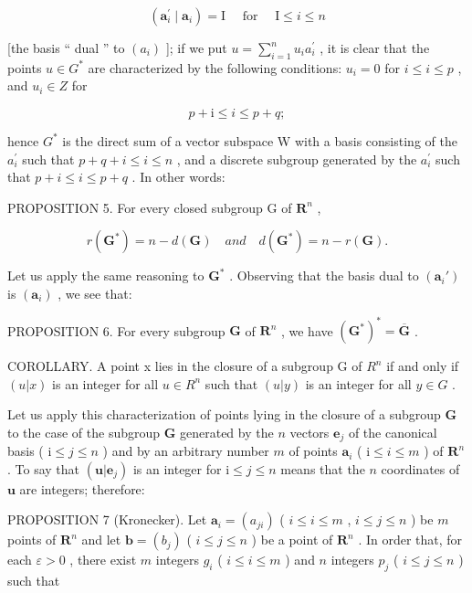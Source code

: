 \[
\left(\boldsymbol {a} _ {i} ^ {\prime} \mid \boldsymbol {a} _ {i}\right) = \mathrm{I} \quad \text { for } \quad \mathrm{I} \leqslant i \leqslant n
\]

{[}the basis `` dual '' to \((a_{i})\) {]}; if we put \(u = \sum_{i=1}^{n} u_{i} a_{i}^{\prime}\) , it is clear that the points \(u \in G^{*}\) are characterized by the following conditions: \(u_{i} = 0\) for \(i \leqslant i \leqslant p\) , and \(u_{i} \in Z\) for

\[
p + \mathrm{i} \leqslant i \leqslant p + q;
\]

hence \(G^{*}\) is the direct sum of a vector subspace W with a basis consisting of the \(a_{i}^{\prime}\) such that \(p + q + i \leqslant i \leqslant n\) , and a discrete subgroup generated by the \(a_{i}^{\prime}\) such that \(p + i \leqslant i \leqslant p + q\) . In other words:

PROPOSITION 5. For every closed subgroup G of \(\mathbf{R}^n\) ,

\[
r (\mathbf {G} ^ {*}) = n - d (\mathbf {G}) \quad a n d \quad d (\mathbf {G} ^ {*}) = n - r (\mathbf {G}).
\]

Let us apply the same reasoning to \(\mathbf{G}^*\) . Observing that the basis dual to \((\pmb{a}_i')\) is \((\pmb{a}_i)\) , we see that:

PROPOSITION 6. For every subgroup \(\mathbf{G}\) of \(\mathbf{R}^n\) , we have \((\mathbf{G}^*)^* = \overline{\mathbf{G}}\) .

COROLLARY. A point x lies in the closure of a subgroup G of \(R^{n}\) if and only if \((u|x)\) is an integer for all \(u \in R^{n}\) such that \((u|y)\) is an integer for all \(y \in G\) .

Let us apply this characterization of points lying in the closure of a subgroup \(\mathbf{G}\) to the case of the subgroup \(\mathbf{G}\) generated by the \(n\) vectors \(\boldsymbol{e}_j\) of the canonical basis ( \(\mathrm{i} \leqslant j \leqslant n\) ) and by an arbitrary number \(m\) of points \(\boldsymbol{a}_i\) ( \(\mathrm{i} \leqslant i \leqslant m\) ) of \(\mathbf{R}^n\) . To say that \((\boldsymbol{u}|\boldsymbol{e}_j)\) is an integer for \(\mathrm{i} \leqslant j \leqslant n\) means that the \(n\) coordinates of \(\boldsymbol{u}\) are integers; therefore:

PROPOSITION 7 (Kronecker). Let \(\boldsymbol{a}_i = (a_{ji})\) ( \(i \leqslant i \leqslant m\) , \(i \leqslant j \leqslant n\) ) be \(m\) points of \(\mathbf{R}^n\) and let \(\boldsymbol{b} = (b_j)\) ( \(i \leqslant j \leqslant n\) ) be a point of \(\mathbf{R}^n\) . In order that, for each \(\varepsilon > 0\) , there exist \(m\) integers \(g_i\) ( \(i \leqslant i \leqslant m\) ) and \(n\) integers \(p_j\) ( \(i \leqslant j \leqslant n\) ) such that

